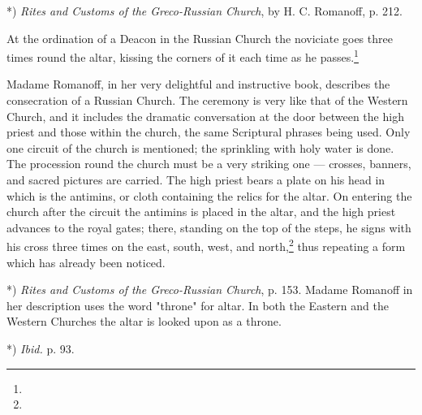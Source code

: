 \documentclass[a4paper, 11pt, oneside, polutonikogreek, english]{article}
\begin{document}
*) \emph{Rites and Customs of the Greco-Russian Church}, by H. C. Romanoff, p. 212.

At the ordination of a Deacon in the Russian Church the noviciate goes three times round the altar, kissing the corners of it each time as he passes.\footnote{}

Madame Romanoff, in her very delightful and instructive book, describes the consecration of a Russian Church. The ceremony is very like that of the Western Church, and it includes the dramatic conversation at the door between the high priest and those within the church, the same Scriptural phrases being used. Only one circuit of the church is mentioned; the sprinkling with holy water is done. The procession round the church must be a very striking one --- crosses, banners, and sacred pictures are carried. The high priest bears a plate on his head in which is the antimins, or cloth containing the relics for the altar. On entering the church after the circuit the antimins is placed in the altar, and the high priest advances to the royal gates; there, standing on the top of the steps, he signs with his cross three times on the east, south, west, and north,\footnote{} thus repeating a form which has already been noticed.

*) \emph{Rites and Customs of the Greco-Russian Church}, p. 153. Madame Romanoff in her description uses the word "throne" for altar. In both the Eastern and the Western Churches the altar is looked upon as a throne.

*) \emph{Ibid.} p. 93.
\end{document}
